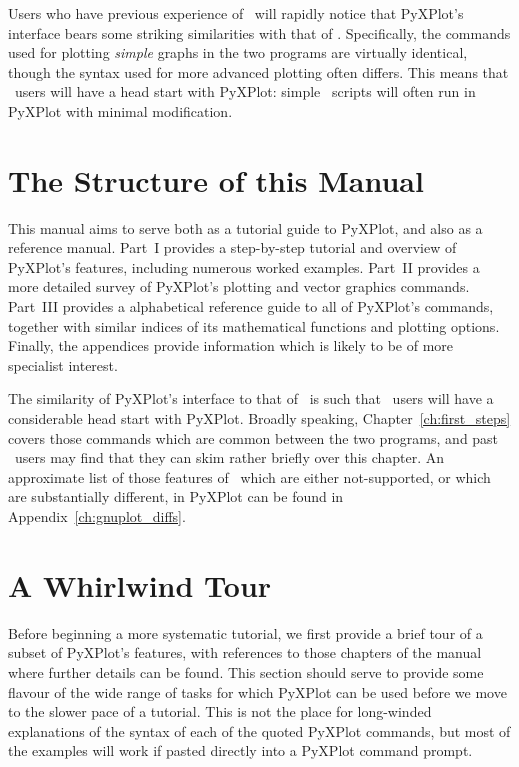 Users who have previous experience of \gnuplot\ will rapidly notice that
PyXPlot's interface bears some striking similarities with that of \gnuplot.
Specifically, the commands used for plotting {\it simple} graphs in the two
programs are virtually identical, though the syntax used for more advanced
plotting often differs. This means that \gnuplot\ users will have a head start
with PyXPlot: simple \gnuplot\ scripts will often run in PyXPlot with minimal
modification.

\section{The Structure of this Manual}

This manual aims to serve both as a tutorial guide to PyXPlot, and also as a
reference manual. Part~I provides a step-by-step tutorial and overview of
PyXPlot's features, including numerous worked examples. Part~II provides a more
detailed survey of PyXPlot's plotting and vector graphics commands. Part~III
provides a alphabetical reference guide to all of PyXPlot's commands, together
with similar indices of its mathematical functions and plotting options.
Finally, the appendices provide information which is likely to be of more
specialist interest.

The similarity of PyXPlot's interface to that of \gnuplot\ is such that
\gnuplot\ users will have a considerable head start with PyXPlot.  Broadly
speaking, Chapter~\ref{ch:first_steps} covers those commands which are common
between the two programs, and past \gnuplot\ users may find that they can skim
rather briefly over this chapter. An approximate list of those features of
\gnuplot\ which are either not-supported, or which are substantially different,
in PyXPlot can be found in Appendix~\ref{ch:gnuplot_diffs}.

\section{A Whirlwind Tour}

Before beginning a more systematic tutorial, we first provide a brief tour of a
subset of PyXPlot's features, with references to those chapters of the manual
where further details can be found. This section should serve to provide some
flavour of the wide range of tasks for which PyXPlot can be used before we move
to the slower pace of a tutorial. This is not the place for long-winded
explanations of the syntax of each of the quoted PyXPlot commands, but most of
the examples will work if pasted directly into a PyXPlot command prompt.

